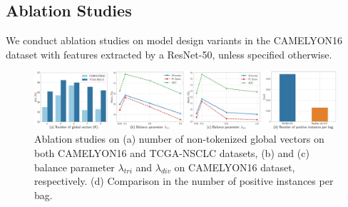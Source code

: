 \documentclass[runningheads]{llncs}
\begin{document}
\subsection{Ablation Studies}
We conduct ablation studies on model design variants in the CAMELYON16 dataset with features extracted by a ResNet-50, unless specified otherwise. 
\begin{figure}[!t]
\centering
\includegraphics[width=1.0\textwidth]{Figure/params.jpg} %
\caption{Ablation studies on (a) number of non-tokenized global vectors on both CAMELYON16 and TCGA-NSCLC datasets, (b) and (c) balance parameter $\lambda_{tri}$ and $\lambda_{div}$ on CAMELYON16 dataset, respectively. (d) Comparison in the number of positive instances per bag.}
\label{fig:Ablation}
\end{figure}



\end{document}
